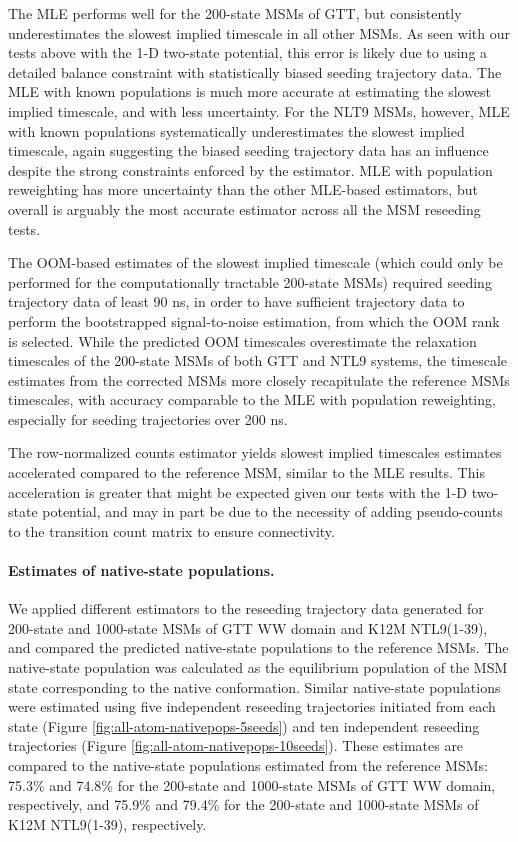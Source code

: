 \documentclass[%
 aip,
rsi,%
 amsmath,amssymb,
 reprint,%
]{revtex4-1}
\begin{document}
The MLE performs well for the 200-state MSMs of GTT, but consistently underestimates the slowest implied timescale in all other MSMs.  As seen with our tests above with the 1-D two-state potential, this error is likely due to using a detailed balance constraint with statistically biased seeding trajectory data. The MLE with known populations is much more accurate at estimating the slowest implied timescale, and with less uncertainty. For the NLT9 MSMs, however, MLE with known populations systematically underestimates the slowest implied timescale, again suggesting the biased seeding trajectory data has an influence despite the strong constraints enforced by the estimator. MLE with population reweighting has more uncertainty than the other MLE-based estimators, but overall is arguably the most accurate estimator across all the MSM reseeding tests.

The OOM-based estimates of the slowest implied timescale (which could only be performed for the computationally tractable 200-state MSMs) required seeding trajectory data of least 90 ns, in order to have sufficient trajectory data to perform the bootstrapped signal-to-noise estimation, from which the OOM rank is selected.  While the predicted OOM timescales overestimate the relaxation timescales of the 200-state MSMs of both GTT and NTL9 systems, the timescale estimates from the corrected MSMs more closely recapitulate the reference MSMs timescales, with accuracy comparable to the MLE with population reweighting, especially for seeding trajectories over 200 ns.

The row-normalized counts estimator yields slowest implied timescales estimates accelerated compared to the reference MSM, similar to the MLE results.  This acceleration is greater that might be expected given our tests with the 1-D two-state potential, and may in part be due to the necessity of adding pseudo-counts to the transition count matrix to ensure connectivity.



\paragraph{Estimates of native-state populations.}

We applied different estimators to the reseeding trajectory data generated for 200-state and 1000-state MSMs of GTT WW domain and K12M NTL9(1-39), and compared the predicted native-state populations to the reference MSMs. The native-state population was calculated as the equilibrium population of the MSM state corresponding to the native conformation.  Similar native-state populations were estimated using five independent reseeding trajectories initiated from each state (Figure \ref{fig:all-atom-nativepops-5seeds}) and ten independent reseeding trajectories (Figure \ref{fig:all-atom-nativepops-10seeds}). These estimates are compared to the native-state populations estimated from the reference MSMs: 75.3\% and 74.8\% for the 200-state and 1000-state MSMs of GTT WW domain, respectively, and 75.9\% and 79.4\% for the 200-state and 1000-state MSMs of K12M NTL9(1-39), respectively.
\end{document}
